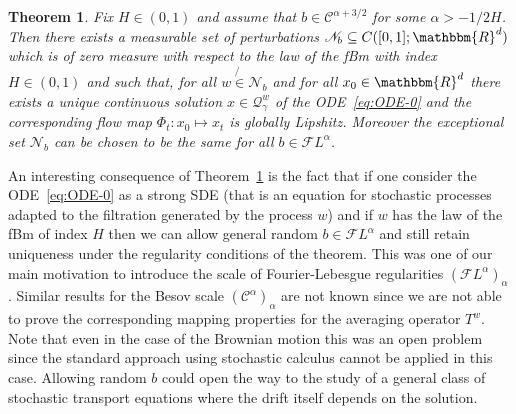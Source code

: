 \documentclass[a4paper,11pt]{article}
\newtheorem{theorem}{Theorem}[section]
\newcommand{\CC}{\mathscr C}
\newcommand{\CF}{\mathscr F}
\newcommand{\CQ}{\mathscr Q}
\newcommand{\CN}{\mathscr N}
\begin{document}
\begin{theorem}
  \label{th:flow-H}Fix $H \in ( 0,1 )$ and assume that $b \in \CC^{\alpha
  +3/2}$ for some $\alpha >-1/2H$. Then there exists a measurable set of
  perturbations $\CN_{b} \subseteq C ( [ 0,1 ] ;\mathbbm{R}^{d} )$
  which is of zero measure with respect to the law of the fBm with index $H
  \in ( 0,1 )$ and such that, for all $w \not{\in} \CN_{b}$ and for
  all $x_{0} \in \mathbbm{R}^{d}$ there exists a unique continuous solution $x
  \in \CQ^{w}_{\gamma}$ of the ODE~{\eqref{eq:ODE-0}} and the
  corresponding flow map $\Phi_{t} :x_{0} \mapsto x_{t}$ is globally Lipshitz.
  Moreover the exceptional set $\CN_{b}$ can be chosen to be the same
  for all $b \in \CF L^{\alpha}$. 
\end{theorem}

An interesting consequence of Theorem~\ref{th:flow-H} is the fact that if one
consider the ODE~{\eqref{eq:ODE-0}} as a strong SDE (that is an equation for
stochastic processes adapted to the filtration generated by the process $w$)
and if $w$ has the law of the fBm of index $H$ then we can allow general
random $b \in \CF L^{\alpha}$ and still retain uniqueness under the regularity
conditions of the theorem. This was one of our main motivation to introduce
the scale of Fourier-Lebesgue regularities $\left( \CF L^{\alpha}
\right)_{\alpha}$. Similar results for the Besov scale $\left( \CC^{\alpha}
\right)_{\alpha}$ are not known since we are not able to prove the
corresponding mapping properties for the averaging operator $T^{w}$. Note that
even in the case of the Brownian motion this was an open problem~{\cite{FGP}}
since the standard approach using stochastic calculus cannot be applied in
this case. Allowing random $b$ could open the way to the study of a general
class of stochastic transport equations where the drift itself depends on the
solution.
\end{document}
